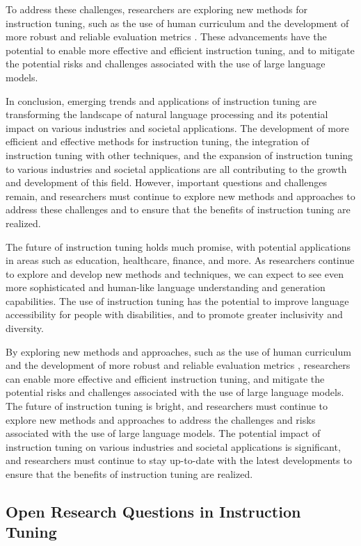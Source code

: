 \documentclass[11pt]{article}
\begin{document}
To address these challenges, researchers are exploring new methods for instruction tuning, such as the use of human curriculum \cite{ref137} and the development of more robust and reliable evaluation metrics \cite{ref127}. These advancements have the potential to enable more effective and efficient instruction tuning, and to mitigate the potential risks and challenges associated with the use of large language models.

In conclusion, emerging trends and applications of instruction tuning are transforming the landscape of natural language processing and its potential impact on various industries and societal applications. The development of more efficient and effective methods for instruction tuning, the integration of instruction tuning with other techniques, and the expansion of instruction tuning to various industries and societal applications are all contributing to the growth and development of this field. However, important questions and challenges remain, and researchers must continue to explore new methods and approaches to address these challenges and to ensure that the benefits of instruction tuning are realized.

The future of instruction tuning holds much promise, with potential applications in areas such as education, healthcare, finance, and more. As researchers continue to explore and develop new methods and techniques, we can expect to see even more sophisticated and human-like language understanding and generation capabilities. The use of instruction tuning has the potential to improve language accessibility for people with disabilities, and to promote greater inclusivity and diversity.

By exploring new methods and approaches, such as the use of human curriculum \cite{ref137} and the development of more robust and reliable evaluation metrics \cite{ref127}, researchers can enable more effective and efficient instruction tuning, and mitigate the potential risks and challenges associated with the use of large language models. The future of instruction tuning is bright, and researchers must continue to explore new methods and approaches to address the challenges and risks associated with the use of large language models. The potential impact of instruction tuning on various industries and societal applications is significant, and researchers must continue to stay up-to-date with the latest developments to ensure that the benefits of instruction tuning are realized.

\subsection{Open Research Questions in Instruction Tuning}
\end{document}
